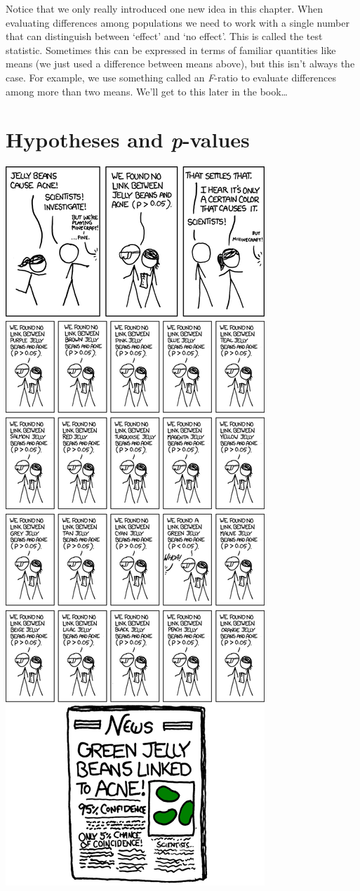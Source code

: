 \documentclass[]{book}
\begin{document}
Notice that we only really introduced one new idea in this chapter. When
evaluating differences among populations we need to work with a single
number that can distinguish between `effect' and `no effect'. This is
called the test statistic. Sometimes this can be expressed in terms of
familiar quantities like means (we just used a difference between means
above), but this isn't always the case. For example, we use something
called an \emph{F}-ratio to evaluate differences among more than two
means. We'll get to this later in the book\ldots{}

\chapter{\texorpdfstring{Hypotheses and
\emph{p}-values}{Hypotheses and p-values}}\label{hypotheses-and-p-values}

\begin{center}\includegraphics[width=0.6\linewidth]{./images/significant_xkcd} \end{center}
\end{document}
